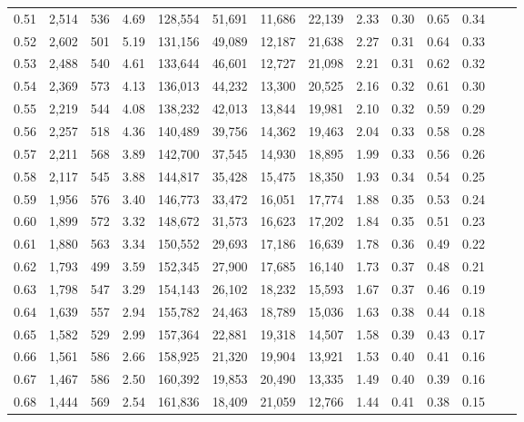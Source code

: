 \begin{tabular}{rrrrrrrrrrrrrr}
0.51 &  2,514 &  536 &    4.69 &  128,554 &   51,691 &  11,686 &  22,139 &  2.33 &  0.30 &  0.65 &      0.34 \\
0.52 &  2,602 &  501 &    5.19 &  131,156 &   49,089 &  12,187 &  21,638 &  2.27 &  0.31 &  0.64 &      0.33 \\
0.53 &  2,488 &  540 &    4.61 &  133,644 &   46,601 &  12,727 &  21,098 &  2.21 &  0.31 &  0.62 &      0.32 \\
0.54 &  2,369 &  573 &    4.13 &  136,013 &   44,232 &  13,300 &  20,525 &  2.16 &  0.32 &  0.61 &      0.30 \\
0.55 &  2,219 &  544 &    4.08 &  138,232 &   42,013 &  13,844 &  19,981 &  2.10 &  0.32 &  0.59 &      0.29 \\
0.56 &  2,257 &  518 &    4.36 &  140,489 &   39,756 &  14,362 &  19,463 &  2.04 &  0.33 &  0.58 &      0.28 \\
0.57 &  2,211 &  568 &    3.89 &  142,700 &   37,545 &  14,930 &  18,895 &  1.99 &  0.33 &  0.56 &      0.26 \\
0.58 &  2,117 &  545 &    3.88 &  144,817 &   35,428 &  15,475 &  18,350 &  1.93 &  0.34 &  0.54 &      0.25 \\
0.59 &  1,956 &  576 &    3.40 &  146,773 &   33,472 &  16,051 &  17,774 &  1.88 &  0.35 &  0.53 &      0.24 \\
0.60 &  1,899 &  572 &    3.32 &  148,672 &   31,573 &  16,623 &  17,202 &  1.84 &  0.35 &  0.51 &      0.23 \\
0.61 &  1,880 &  563 &    3.34 &  150,552 &   29,693 &  17,186 &  16,639 &  1.78 &  0.36 &  0.49 &      0.22 \\
0.62 &  1,793 &  499 &    3.59 &  152,345 &   27,900 &  17,685 &  16,140 &  1.73 &  0.37 &  0.48 &      0.21 \\
0.63 &  1,798 &  547 &    3.29 &  154,143 &   26,102 &  18,232 &  15,593 &  1.67 &  0.37 &  0.46 &      0.19 \\
0.64 &  1,639 &  557 &    2.94 &  155,782 &   24,463 &  18,789 &  15,036 &  1.63 &  0.38 &  0.44 &      0.18 \\
0.65 &  1,582 &  529 &    2.99 &  157,364 &   22,881 &  19,318 &  14,507 &  1.58 &  0.39 &  0.43 &      0.17 \\
0.66 &  1,561 &  586 &    2.66 &  158,925 &   21,320 &  19,904 &  13,921 &  1.53 &  0.40 &  0.41 &      0.16 \\
0.67 &  1,467 &  586 &    2.50 &  160,392 &   19,853 &  20,490 &  13,335 &  1.49 &  0.40 &  0.39 &      0.16 \\
0.68 &  1,444 &  569 &    2.54 &  161,836 &   18,409 &  21,059 &  12,766 &  1.44 &  0.41 &  0.38 &      0.15 \\

\end{tabular}
